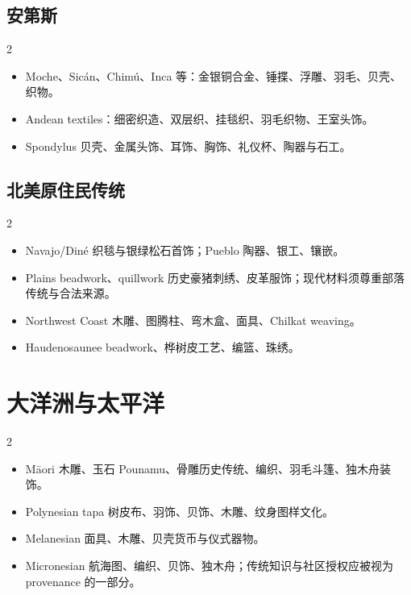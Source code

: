 \documentclass[lang=en,a4paper,11pt]{elegantpaper}
\begin{document}
\subsection{安第斯}


\begin{multicols}{2}
\begin{itemize}
\item Moche、Sicán、Chimú、Inca 等：金银铜合金、锤揲、浮雕、羽毛、贝壳、织物。
\item Andean textiles：细密织造、双层织、挂毯织、羽毛织物、王室头饰。
\item Spondylus 贝壳、金属头饰、耳饰、胸饰、礼仪杯、陶器与石工。
\end{itemize}
\end{multicols}

\subsection{北美原住民传统}


\begin{multicols}{2}
\begin{itemize}
\item Navajo/Diné 织毯与银绿松石首饰；Pueblo 陶器、银工、镶嵌。
\item Plains beadwork、quillwork 历史豪猪刺绣、皮革服饰；现代材料须尊重部落传统与合法来源。
\item Northwest Coast 木雕、图腾柱、弯木盒、面具、Chilkat weaving。
\item Haudenosaunee beadwork、桦树皮工艺、编篮、珠绣。
\end{itemize}
\end{multicols}

\section{大洋洲与太平洋}


\begin{multicols}{2}
\begin{itemize}
\item Māori 木雕、玉石 Pounamu、骨雕历史传统、编织、羽毛斗篷、独木舟装饰。
\item Polynesian tapa 树皮布、羽饰、贝饰、木雕、纹身图样文化。
\item Melanesian 面具、木雕、贝壳货币与仪式器物。
\item Micronesian 航海图、编织、贝饰、独木舟；传统知识与社区授权应被视为 provenance 的一部分。
\end{itemize}
\end{multicols}
\end{document}
